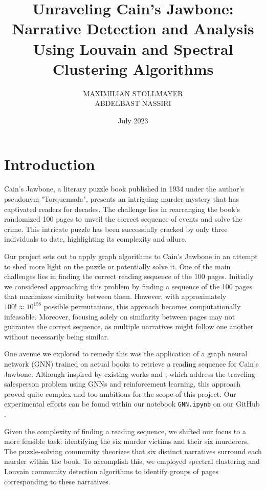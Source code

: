 \documentclass[a4paper]{article}
\title{Unraveling Cain's Jawbone: Narrative Detection and Analysis Using Louvain and Spectral Clustering Algorithms}
\author{MAXIMILIAN STOLLMAYER \\ 
ABDELBAST NASSIRI}
\date{July 2023}
\begin{document}
\maketitle

\section{Introduction}

Cain's Jawbone, a literary puzzle book published in 1934 under the author's pseudonym "Torquemada", presents an intriguing murder mystery that has captivated readers for decades. The challenge lies in rearranging the book's randomized 100 pages to unveil the correct sequence of events and solve the crime. This intricate puzzle has been successfully cracked by only three individuals to date, highlighting its complexity and allure.

Our project sets out to apply graph algorithms to Cain's Jawbone in an attempt to shed more light on the puzzle or potentially solve it. One of the main challenges lies in finding the correct reading sequence of the 100 pages. Initially we considered approaching this problem by finding a sequence of the 100 pages that maximizes similarity between them. However, with approximately $100! \approx 10^{158}$ possible permutations, this approach becomes computationally infeasable. Moreover, focusing solely on similarity between pages may not guarantee the correct sequence, as multiple narratives might follow one another without necessarily being similar.

One avenue we explored to remedy this was the application of a graph neural network (GNN) trained on actual books to retrieve a reading sequence for Cain's Jawbone. Although inspired by existing works \cite{GNN1} and \cite{GNN2}, which address the traveling salesperson problem using GNNs and reinforcement learning, this approach proved quite complex and too ambitious for the scope of this project. Our experimental efforts can be found within our notebook \verb|GNN.ipynb| on our GitHub \cite{github}.

Given the complexity of finding a reading sequence, we shifted our focus to a more feasible task: identifying the six murder victims and their six murderers. The puzzle-solving community theorizes that six distinct narratives surround each murder within the book. To accomplish this, we employed spectral clustering and Louvain community detection algorithms to identify groups of pages corresponding to these narratives.
\end{document}
